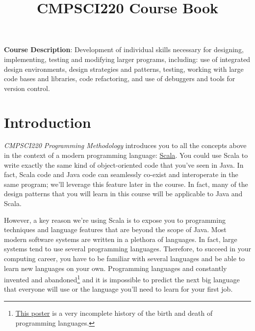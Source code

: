 \documentclass{book}
\title{CMPSCI220 Course Book}
\begin{document}
\maketitle
\tableofcontents

\newlecture

\textbf{Course Description}: Development of individual skills necessary for
designing, implementing, testing and modifying larger programs, including: use
of integrated design environments, design strategies and patterns, testing,
working with large code bases and libraries, code refactoring, and use of
debuggers and tools for version control.

\section{Introduction}

\emph{CMPSCI220 Programming Methodology} introduces you to all the concepts
above in the context of a modern programming language:
\href{http://www.scala-lang.org/what-is-scala.html}{Scala}.
You could use Scala to write exactly the same kind
of object-oriented code that you've seen in Java. In fact, Scala code and Java
code can seamlessly co-exist and interoperate in the same program; we'll
leverage this feature later in the course. In fact, many of the design patterns
that you will learn in this course will be applicable to Java and Scala.

However, a key reason we're using Scala is to expose you to programming techniques
and language features that are beyond the scope of Java. Most
modern software systems are written in a plethora of languages. In fact, large
systems tend to use several programming languages. Therefore, to succeed in your
computing career, you have to be familiar with several languages and be able to
learn new languages on your own. Programming
languages and constantly invented and abandoned\footnote{\href{http://www.oreillynet.com/pub/a/oreilly/news/languageposter_0504.html}{This poster} is a very incomplete history of the birth and death of programming languages.}
 and it is impossible to predict the next big language that everyone
will use or the language you'll need to learn for your first job.
\end{document}
